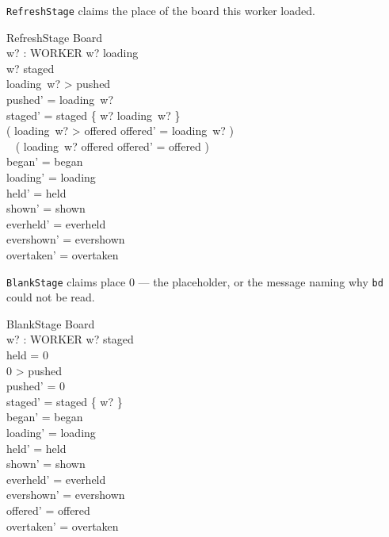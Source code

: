 \documentclass[a4paper,10pt,fleqn]{article}
\begin{document}
\texttt{RefreshStage} claims the place of the board this worker loaded.

\begin{schema}{RefreshStage}
  \Delta Board \\
  w? : WORKER
\where
  w? \in \dom loading \\
  w? \notin \dom staged \\
  loading~w? > pushed \\
  pushed' = loading~w? \\
  staged' = staged \cup \{ w? \mapsto loading~w? \} \\
  ( loading~w? > offered \land offered' = loading~w? ) \lor \\
  \quad~ ( loading~w? \leq offered \land offered' = offered ) \\
  began' = began \\
  loading' = loading \\
  held' = held \\
  shown' = shown \\
  everheld' = everheld \\
  evershown' = evershown \\
  overtaken' = overtaken
\end{schema}

\texttt{BlankStage} claims place $0$ --- the placeholder, or the message naming
why \texttt{bd} could not be read.

\begin{schema}{BlankStage}
  \Delta Board \\
  w? : WORKER
\where
  w? \notin \dom staged \\
  held = 0 \\
  0 > pushed \\
  pushed' = 0 \\
  staged' = staged \cup \{ w?  \} \\
  began' = began \\
  loading' = loading \\
  held' = held \\
  shown' = shown \\
  everheld' = everheld \\
  evershown' = evershown \\
  offered' = offered \\
  overtaken' = overtaken
\end{schema}
\end{document}
